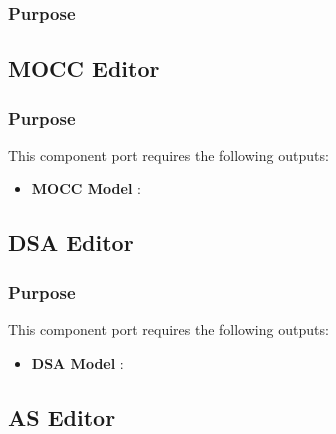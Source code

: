 \documentclass{gemoc} %
\begin{document}

\subsubsection{Purpose}



\subsection{MOCC Editor}


\subsubsection{Purpose}


This component port requires the following outputs:
\begin{itemize}
  \item \textbf{MOCC Model} :
\end{itemize}

\subsection{DSA Editor}


\subsubsection{Purpose}


This component port requires the following outputs:
\begin{itemize}
  \item \textbf{DSA Model} :
\end{itemize}

\subsection{AS Editor}
\end{document}
